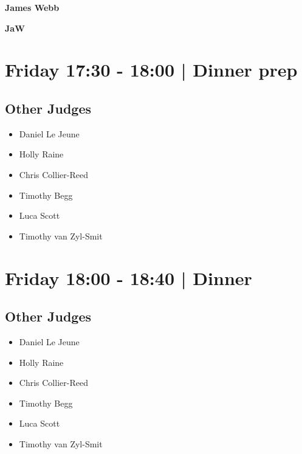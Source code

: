 \documentclass[10pt, A5]{article}
\newcommand{\newtitle}[1]{\begin{center}{\Huge\bfseries #1 }\\ \vspace{5mm}\end{center}}
\newcommand{\newsubtitle}[1]{\begin{center}{\color{grey}\Large\bfseries #1 }\\ \vspace{5mm}\end{center}}
\begin{document}
    
	\clearpage

		\newtitle{James Webb}
	\newsubtitle{JaW}

            \section*{Friday 17:30
        -
        18:00
        |
         Dinner prep}
        
                
        \subsection*{Other Judges}
        
            \begin{itemize}
                            \item Daniel Le Jeune
                            \item Holly Raine
                            \item Chris Collier-Reed
                            \item Timothy Begg
                            \item Luca Scott
                            \item Timothy van Zyl-Smit
                        \end{itemize}
        

            \section*{Friday 18:00
        -
        18:40
        |
         Dinner }
        
                
        \subsection*{Other Judges}
        
            \begin{itemize}
                            \item Daniel Le Jeune
                            \item Holly Raine
                            \item Chris Collier-Reed
                            \item Timothy Begg
                            \item Luca Scott
                            \item Timothy van Zyl-Smit
                        \end{itemize}
        
\end{document}
